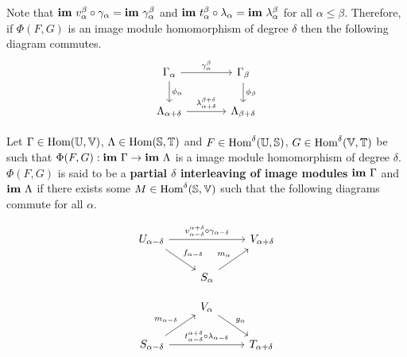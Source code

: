 Note that $\mathbf{im}~v_\alpha^\beta\circ\gamma_\alpha = \mathbf{im}~\gamma_\alpha^\beta$ and $\mathbf{im}~t_{\alpha}^{\beta}\circ\lambda_{\alpha} = \mathbf{im}~\lambda_\alpha^\beta$ for all $\alpha\leq\beta$.
Therefore, if $\Phi(F, G)$ is an image module homomorphism of degree $\delta$ then the following diagram commutes.
\begin{equation}\label{dgm:shifted_homomorphism}
  \begin{tikzcd}[column sep=large]
    \Gamma_\alpha\arrow{r}{\gamma_\alpha^\beta}\arrow{d}{\phi_\alpha} &
    \Gamma_\beta\arrow{d}{\phi_\beta}\\
    \Lambda_{\alpha+\delta}\arrow{r}{\lambda_{\alpha+\delta}^{\beta+\delta}} &
    \Lambda_{\beta +\delta}
\end{tikzcd}\end{equation}

Let $\Gamma\in\text{Hom}(\mathbb{U},\mathbb{V})$, $\Lambda\in\text{Hom}(\mathbb{S},\mathbb{T})$ and $F\in\text{Hom}^\delta(\mathbb{U}, \mathbb{S})$, $G\in\text{Hom}^\delta(\mathbb{V}, \mathbb{T})$ be such that $\Phi(F,G) : \mathbf{im}~\Gamma\to\mathbf{im}~\Lambda$ is a image module homomorphism of degree $\delta$.
$\Phi(F, G)$ is said to be a \textbf{partial $\delta$ interleaving of image modules} $\mathbf{im}~\Gamma$ and $\mathbf{im}~\Lambda$ if there exists some $M\in\text{Hom}^\delta(\mathbb{S},\mathbb{V})$ such that the following diagrams commute for all $\alpha$.

\begin{minipage}{0.45\textwidth}
\begin{equation}\label{dgm:partial_interleaving1}
  \begin{tikzcd}
    U_{\alpha-\delta}\arrow{rr}{v_{\alpha-\delta}^{\alpha+\delta}\circ\gamma_{\alpha-\delta}}\arrow{dr}{f_{\alpha-\delta}} & &
    V_{\alpha+\delta}\\
    & S_{\alpha}\arrow{ur}{m_\alpha} &
\end{tikzcd}\end{equation}
\end{minipage}
\begin{minipage}{0.45\textwidth}
\begin{equation}\label{dgm:partial_interleaving2}
  \begin{tikzcd}
    & V_{\alpha}\arrow{dr}{g_\alpha} &\\
    S_{\alpha-\delta}\arrow{rr}{t_{\alpha-\delta}^{\alpha+\delta}\circ\lambda_{\alpha-\delta}}\arrow{ur}{m_{\alpha-\delta}} & &
    T_{\alpha+\delta}
\end{tikzcd}\end{equation}
\end{minipage}

